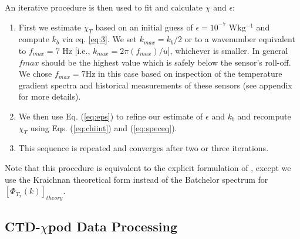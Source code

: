 \documentclass{ametsoc}
\begin{document}
An iterative procedure is then used to fit and calculate $\chi$ and $\epsilon$:

\begin{enumerate}
\item First we estimate $\chi_T$ based on an initial guess of $\epsilon=10^{-7}$ $\mathrm{Wkg^{-1}}$ and compute $k_b$ via eq. \ref{eq:3}. We set $k_{max} = k_b/2$ or to a wavenumber equivalent to $f_{max}=7$ Hz [i.e., $k_{max}= 2\pi(f_{max})/u$], whichever is smaller. In general $fmax$ should be the highest value which is safely below the sensor's roll-off. We chose $f_{max}=7$Hz in this case based on inspection of the temperature gradient spectra and historical measurements of these sensors (see appendix for more details).
\item We then use Eq. (\ref{eq:eps}) to refine our estimate of $\epsilon$ and $k_b$ and recompute $\chi_T$ using Eqs. (\ref{eq:chiint}) and (\ref{eq:speceq}). 
\item This sequence is repeated and converges after two or three iterations.
\end{enumerate}
Note that this procedure is equivalent to the explicit formulation of \citep{alfordpinkel00b}, except we use the Kraichnan theoretical form instead of the Batchelor spectrum for $[\Phi_{T_x}(k)]_{theory}$.

\subsection{CTD-$\chi$pod Data Processing}
\end{document}
